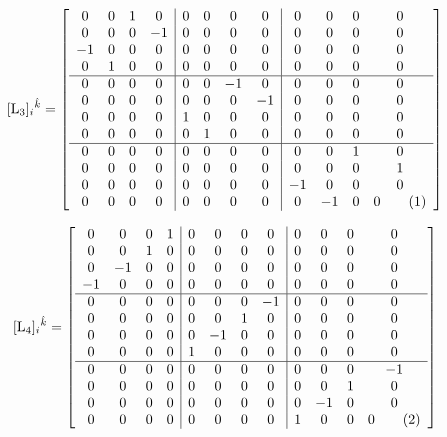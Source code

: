 \documentclass[12pt]{article}
\newcommand\numberthis{\addtocounter{equation}{1}\tag{\theequation}}
\begin{document}
\[
[{\rm L_3}]_{i}{}^{\hat k}  = \left[\begin{array}{cccc|cccc|cccc}
    0 & 0 & 1 & 0 & 0 & 0 & 0 & 0 & 0 & 0 & 0 & 0 \\  
    0 & 0 & 0 & -1 & 0 & 0 & 0 & 0 & 0 & 0 & 0 & 0 \\ 
    -1 & 0 & 0 & 0 & 0 & 0 & 0 & 0 & 0 & 0 & 0 & 0 \\ 
    0 & 1 & 0 & 0 & 0 & 0 & 0 & 0 & 0 & 0 & 0 & 0 \\  
    \hline
    0 & 0 & 0 & 0 & 0 & 0 & -1 & 0 & 0 & 0 & 0 & 0 \\ 
    0 & 0 & 0 & 0 & 0 & 0 & 0 & -1 & 0 & 0 & 0 & 0 \\ 
    0 & 0 & 0 & 0 & 1 & 0 & 0 & 0 & 0 & 0 & 0 & 0 \\  
    0 & 0 & 0 & 0 & 0 & 1 & 0 & 0 & 0 & 0 & 0 & 0 \\  
    \hline
    0 & 0 & 0 & 0 & 0 & 0 & 0 & 0 & 0 & 0 & 1 & 0 \\  
    0 & 0 & 0 & 0 & 0 & 0 & 0 & 0 & 0 & 0 & 0 & 1 \\  
    0 & 0 & 0 & 0 & 0 & 0 & 0 & 0 & -1 & 0 & 0 & 0 \\ 
    0 & 0 & 0 & 0 & 0 & 0 & 0 & 0 & 0 & -1 & 0 & 0
\numberthis\end{array}\right] \]

\[
[{\rm L_4}]_{i}{}^{\hat k}  = \left[\begin{array}{cccc|cccc|cccc}
    0 & 0 & 0 & 1 & 0 & 0 & 0 & 0 & 0 & 0 & 0 & 0 \\
    0 & 0 & 1 & 0 & 0 & 0 & 0 & 0 & 0 & 0 & 0 & 0 \\
    0 & -1 & 0 & 0 & 0 & 0 & 0 & 0 & 0 & 0 & 0 & 0 \\
    -1 & 0 & 0 & 0 & 0 & 0 & 0 & 0 & 0 & 0 & 0 & 0 \\
    \hline
    0 & 0 & 0 & 0 & 0 & 0 & 0 & -1 & 0 & 0 & 0 & 0 \\
    0 & 0 & 0 & 0 & 0 & 0 & 1 & 0 & 0 & 0 & 0 & 0 \\
    0 & 0 & 0 & 0 & 0 & -1 & 0 & 0 & 0 & 0 & 0 & 0 \\
    0 & 0 & 0 & 0 & 1 & 0 & 0 & 0 & 0 & 0 & 0 & 0 \\
    \hline
    0 & 0 & 0 & 0 & 0 & 0 & 0 & 0 & 0 & 0 & 0 & -1 \\
    0 & 0 & 0 & 0 & 0 & 0 & 0 & 0 & 0 & 0 & 1 & 0 \\
    0 & 0 & 0 & 0 & 0 & 0 & 0 & 0 & 0 & -1 & 0 & 0 \\
    0 & 0 & 0 & 0 & 0 & 0 & 0 & 0 & 1 & 0 & 0 & 0
\numberthis\end{array}\right] \]
\end{document}
